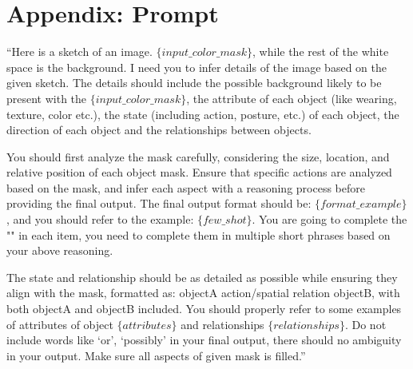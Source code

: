 \appendix

\section{Appendix: Prompt}
\label{sec:appendix}
``Here is a sketch of an image. 
$\{input\_color\_mask\}$, while the rest of the white space is the background. 
I need you to infer details of the image based on the given sketch.
The details should include the possible background likely to be present with the $\{input\_color\_mask\}$, the attribute of each object (like wearing, texture, color etc.), the state (including action, posture, etc.) of each object, the direction of each object and the relationships between objects.

You should first analyze the mask carefully, considering the size, location, and relative position of each object mask. Ensure that specific actions are analyzed based on the mask, and infer each aspect with a reasoning process before providing the final output.
The final output format should be: $\{format\_example\}$, and you should refer to the example: $\{few\_shot\}$. You are going to complete the "" in each item, you need to complete them in multiple short phrases based on your above reasoning.

The state and relationship should be as detailed as possible while ensuring they align with the mask, formatted as: objectA action/spatial relation objectB, with both objectA and objectB included.
You should properly refer to some examples of attributes of object $\{attributes\}$ and relationships $\{relationships\}$.
Do not include words like `or', `possibly' in your final output, there should no ambiguity in your output.
Make sure all aspects of given mask is filled.''